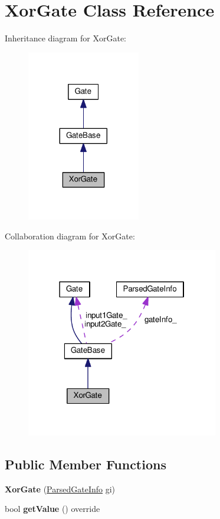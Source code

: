 \hypertarget{classXorGate}{}\section{Xor\+Gate Class Reference}
\label{classXorGate}


Inheritance diagram for Xor\+Gate\+:
\nopagebreak
\begin{figure}[H]
\begin{center}
\leavevmode
\includegraphics[width=140pt]{classXorGate__inherit__graph}
\end{center}
\end{figure}


Collaboration diagram for Xor\+Gate\+:
\nopagebreak
\begin{figure}[H]
\begin{center}
\leavevmode
\includegraphics[width=238pt]{classXorGate__coll__graph}
\end{center}
\end{figure}
\subsection*{Public Member Functions}
\begin{DoxyCompactItemize}
\item 
{\bfseries Xor\+Gate} (\hyperlink{structParsedGateInfo}{Parsed\+Gate\+Info} gi)\hypertarget{classXorGate_aedcc41a85beb20e76d0c63233cc4dec7}{}\label{classXorGate_aedcc41a85beb20e76d0c63233cc4dec7}

\item 
bool {\bfseries get\+Value} () override\hypertarget{classXorGate_a2650b38740d17322fec0af68b7e9a10e}{}\label{classXorGate_a2650b38740d17322fec0af68b7e9a10e}

\end{DoxyCompactItemize}
